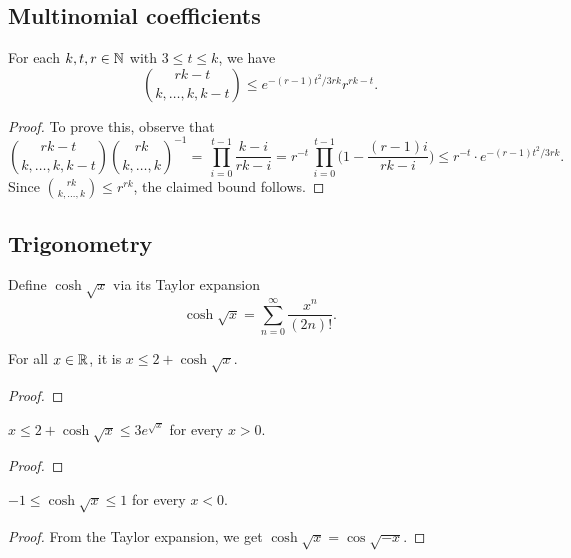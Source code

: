\subsection{Multinomial coefficients}

\begin{lemma}  
  \label{lem:multibounds}
  For each $k,t,r \in \mathbb{N}$ with $3 \le t \le k$, we have
  $$\binom{rk-t}{k,\dots,k,k-t} \le e^{-(r-1)t^2/3rk} r^{rk-t}.$$
\end{lemma}
  
\begin{proof}
  To prove this, observe that 
  $$\binom{rk-t}{k,\dots,k,k-t} \binom{rk}{k,\dots,k}^{-1} = \, \prod_{i = 0}^{t - 1} \frac{k - i}{rk - i} = r^{-t} \,\prod_{i = 0}^{t-1} \bigg( 1 - \frac{(r-1)i}{rk - i} \bigg) \le r^{-t} \cdot e^{-(r-1)t^2/3rk}.$$
  Since $\binom{rk}{k,\dots,k} \le r^{rk}$, the claimed bound follows.
\end{proof}


\subsection{Trigonometry}

\begin{definition}
  \label{def:coshsqrt}
  \leanok
  Define $\cosh \sqrt{x}$ via its Taylor expansion
  $$\cosh\sqrt{x} = \sum_{n = 0}^\infty \frac{x^n}{(2n)!}.$$
\end{definition}

\begin{lemma}
  \label{lem:le-coshsqrt}
  For all $x \in \mathbb{R}$, it is $x \le 2 + \cosh\sqrt{x}$.
\end{lemma}
\begin{proof}
\end{proof}

\begin{lemma}
  \label{lem:coshsqrt-bd-pos}
  $x \le 2 + \cosh \sqrt{x} \le 3 e^{\sqrt{x}}$ for every $x > 0$.
\end{lemma}
\begin{proof}
\end{proof}

\begin{lemma}
  \label{lem:coshsqrt-bd-neg}
  $-1 \le \cosh \sqrt{x} \le 1$ for every $x < 0$.
\end{lemma}
\begin{proof}
  From the Taylor expansion, we get $\cosh \sqrt{x} = \cos \sqrt{-x}$.
\end{proof}

